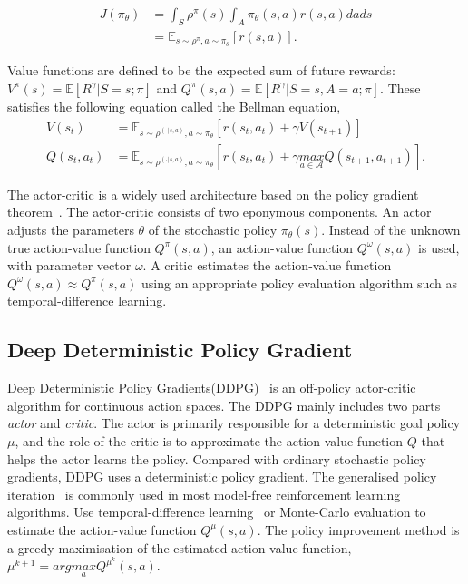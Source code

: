 \documentclass[8pt,twoside,a4paper]{article}
\begin{document}
\begin{equation}
\begin{aligned}
J(\pi_{\theta })&=\int _{S}\rho^{\pi }(s)\int _{A}\pi _{\theta }(s,a)r(s,a)dads\\
&=\mathbb{E}_{s\sim \rho ^{\pi},a\sim \pi _{\theta }}[r(s,a)].
\end{aligned}
\end{equation}
\par Value functions are defined to be the expected sum of future rewards: $V^{\pi}(s)=\mathbb{E}[R^{\gamma}|S=s;\pi]$ and $Q^{\pi}(s,a)=\mathbb{E}[R^{\gamma}|S=s,A=a;\pi]$. These satisfies the following equation called the Bellman equation,
\begin{equation}
\begin{aligned}
V(s_{t})&=\mathbb{E}_{s\sim \rho ^{(\cdot |s,a)},a \sim \pi _{\theta }}[r(s_{t},a_{t})+\gamma V(s_{t+1})]\\
Q(s_{t},a_{t})&=\mathbb{E}_{s\sim \rho ^{(\cdot |s,a)},a \sim \pi _{\theta }}[r(s_{t},a_{t})+\gamma \underset{a\in \mathcal{A}}{max} Q(s_{t+1},a_{t+1})].
\end{aligned}
\end{equation}

\par The actor-critic is a widely used architecture based on the policy gradient theorem~\cite{sutton1998introduction,Peters2008Natural,Degris2012Model}. The actor-critic consists of two eponymous components. An actor adjusts the parameters $\theta$ of the stochastic policy $\pi_{\theta}(s)$. Instead of the unknown true action-value function $Q^{\pi}(s, a)$, an action-value function $Q^{\omega}(s, a)$ is used, with parameter vector $\omega$. A critic estimates the action-value function $Q^{\omega}(s, a) \approx Q^{\pi}(s, a)$ using an appropriate policy evaluation algorithm such as temporal-difference learning.

\subsection{Deep Deterministic Policy Gradient}
Deep Deterministic Policy Gradients(DDPG)~\cite{lillicrap2016continuous} is an off-policy actor-critic algorithm for continuous action spaces. The DDPG mainly includes two parts \emph{actor} and \emph{critic}. The actor is primarily responsible for a deterministic goal policy $\mu$, and the role of the critic is to approximate the action-value function $Q$ that helps the actor learns the policy. Compared with ordinary stochastic policy gradients, DDPG uses a deterministic policy gradient. The generalised policy iteration~\cite{sutton1998introduction} is commonly used in most model-free reinforcement learning algorithms. Use temporal-difference learning~\cite{bhatnagar2007incremental,Degris12linearoff-policy,Peters2008Natural} or Monte-Carlo evaluation to estimate the action-value function $Q^{\mu}(s,a)$. The policy improvement method is a greedy maximisation of the estimated action-value function, $\mu ^{k+1} = arg\underset{a}{max}Q^{\mu ^{k}}(s,a)$.
\end{document}
